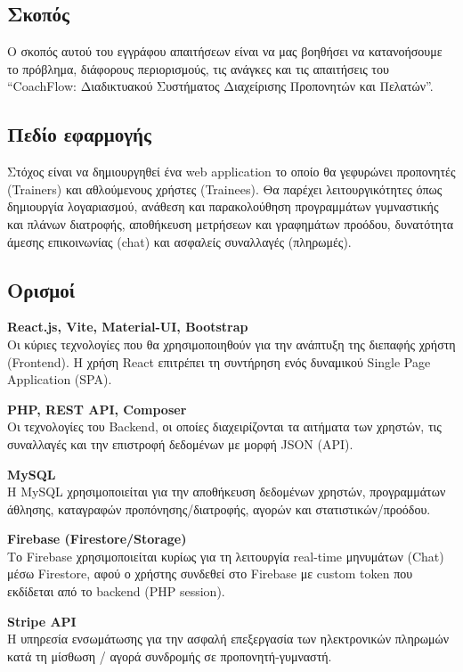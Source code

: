 \documentclass[12pt,a4paper]{report}
\begin{document}
\subsection{Σκοπός}
Ο σκοπός αυτού του εγγράφου απαιτήσεων είναι να μας βοηθήσει να κατανοήσουμε το πρόβλημα, διάφορους περιορισμούς, τις ανάγκες και τις απαιτήσεις του “CoachFlow: Διαδικτυακού Συστήματος Διαχείρισης Προπονητών και Πελατών”.

\subsection{Πεδίο εφαρμογής}
Στόχος είναι να δημιουργηθεί ένα web application το οποίο θα γεφυρώνει προπονητές (Trainers) και αθλούμενους χρήστες (Trainees). Θα παρέχει λειτουργικότητες όπως δημιουργία λογαριασμού, ανάθεση και παρακολούθηση προγραμμάτων γυμναστικής και πλάνων διατροφής, αποθήκευση μετρήσεων και γραφημάτων προόδου, δυνατότητα άμεσης επικοινωνίας (chat) και ασφαλείς συναλλαγές (πληρωμές).

\subsection{Ορισμοί}
\textbf{React.js, Vite, Material-UI, Bootstrap} \\
Οι κύριες τεχνολογίες που θα χρησιμοποιηθούν για την ανάπτυξη της διεπαφής χρήστη (Frontend). Η χρήση React επιτρέπει τη συντήρηση ενός δυναμικού Single Page Application (SPA).

\textbf{PHP, REST API, Composer} \\
Οι τεχνολογίες του Backend, οι οποίες διαχειρίζονται τα αιτήματα των χρηστών, τις συναλλαγές και την επιστροφή δεδομένων με μορφή JSON (API).

\textbf{MySQL} \\
Η MySQL χρησιμοποιείται για την αποθήκευση δεδομένων χρηστών, προγραμμάτων άθλησης, καταγραφών προπόνησης/διατροφής, αγορών και στατιστικών/προόδου.

\textbf{Firebase (Firestore/Storage)} \\
Το Firebase χρησιμοποιείται κυρίως για τη λειτουργία real-time μηνυμάτων (Chat) μέσω Firestore, αφού ο χρήστης συνδεθεί στο Firebase με custom token που εκδίδεται από το backend (PHP session).

\textbf{Stripe API} \\
Η υπηρεσία ενσωμάτωσης για την ασφαλή επεξεργασία των ηλεκτρονικών πληρωμών κατά τη μίσθωση / αγορά συνδρομής σε προπονητή-γυμναστή.
\end{document}
